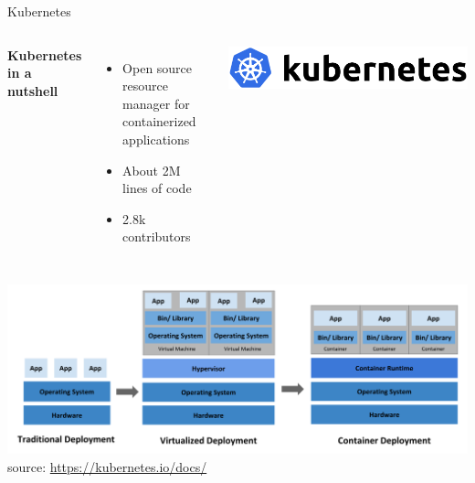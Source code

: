 \documentclass[12pt, aspectratio=43]{beamer}
\begin{document}
\begin{frame}{Kubernetes}
	\begin{columns}
		\textbf{Kubernetes in a nutshell}
		\begin{itemize}
			\item Open source resource manager for containerized applications
			\item About 2M lines of code
			\item 2.8k contributors
		\end{itemize}

		\centering
		\includegraphics[width=\textwidth]{../imgs/kube-logo.png}
	\end{columns}

	\centering
	\includegraphics[width=\textwidth]{../imgs/container_evolution.png}
	\tiny{source: \url{https://kubernetes.io/docs/}}
\end{frame}
\end{document}
